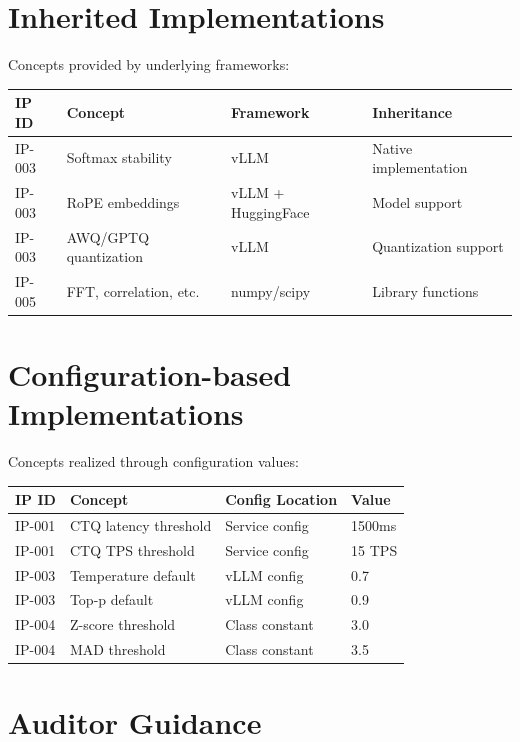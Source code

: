 \section{Inherited Implementations}

Concepts provided by underlying frameworks:

\begin{longtable}{@{}p{1.2cm}p{3cm}p{3cm}p{3cm}@{}}
\toprule
\textbf{IP ID} & \textbf{Concept} & \textbf{Framework} & \textbf{Inheritance} \\
\midrule
\endfirsthead
\bottomrule
\endlastfoot

IP-003 & Softmax stability & vLLM & Native implementation \\
IP-003 & RoPE embeddings & vLLM + HuggingFace & Model support \\
IP-003 & AWQ/GPTQ quantization & vLLM & Quantization support \\
IP-005 & FFT, correlation, etc. & numpy/scipy & Library functions \\

\end{longtable}

\section{Configuration-based Implementations}

Concepts realized through configuration values:

\begin{longtable}{@{}p{1.2cm}p{3.5cm}p{3cm}p{3cm}@{}}
\toprule
\textbf{IP ID} & \textbf{Concept} & \textbf{Config Location} & \textbf{Value} \\
\midrule
\endfirsthead
\bottomrule
\endlastfoot

IP-001 & CTQ latency threshold & Service config & 1500ms \\
IP-001 & CTQ TPS threshold & Service config & 15 TPS \\
IP-003 & Temperature default & vLLM config & 0.7 \\
IP-003 & Top-p default & vLLM config & 0.9 \\
IP-004 & Z-score threshold & Class constant & 3.0 \\
IP-004 & MAD threshold & Class constant & 3.5 \\

\end{longtable}

\section{Auditor Guidance}

